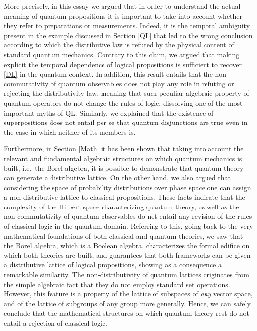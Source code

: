 \documentclass[11pt, executivepaper]{article}
\begin{document}
More precisely, in this essay we argued that in order to understand the actual meaning of quantum propositions it is important to take into account whether they refer to preparations or measurements. Indeed, it is the temporal ambiguity present in the example discussed in Section \ref{QL} that led to the wrong conclusion according to which the distributive law is refuted by the physical content of standard quantum mechanics. Contrary to this claim, we argued that making explicit the temporal dependence of logical propositions is sufficient to recover \eqref{DL} in the quantum context. In addition, this result entails that the non-commutativity of quantum observables does not play any role in refuting or rejecting the distributivity law, meaning that such peculiar algebraic property of quantum operators do not change the rules of logic, dissolving one of the most important myths of QL. Similarly, we explained that the existence of superpositions does not entail per se that quantum disjunctions are true even in the case in which neither of its members is. 

Furthermore, in Section \ref{Math} it has been shown that taking into account the relevant and fundamental algebraic structures on which quantum mechanics is built, i.e.\ the Borel algebra, it is possible to demonstrate that quantum theory can generate a distributive lattice. On the other hand, we also argued that considering the space of probability distributions over phase space one can assign a non-distributive lattice to classical propositions. These facts indicate that the complexity of the Hilbert space characterizing quantum theory, as well as the non-commutativity of quantum observables do not entail any revision of the rules of classical logic in the quantum domain. Referring to this, going back to the very mathematical foundations of both classical and quantum theories, we saw that the Borel algebra, which is a Boolean algebra, characterizes the formal edifice on which both theories are built, and guarantees that both frameworks can be given a distributive lattice of logical propositions, showing as a consequence a remarkable similarity. The non-distributivity of quantum lattices originates from the simple algebraic fact that they do not employ standard set operations. However, this feature is a property of the lattice of subspaces of \emph{any} vector space, and of the lattice of subgroups of any group more generally. Hence, we can safely conclude that the mathematical structures on which quantum theory rest do not entail a rejection of classical logic. 
\end{document}
